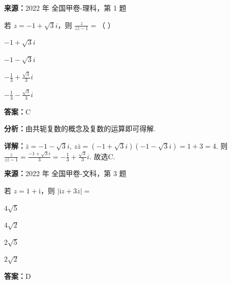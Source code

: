\begin{question}[points=5]
\textbf{来源：}2022 年 全国甲卷-理科，第 1 题\par
若 $z = -1 + \sqrt{3}i$，则 $\frac{z}{z\bar{z} - 1} = $（ ）
\begin{choices}
  \item $-1+\sqrt{3}i$
  \item $-1-\sqrt{3}i$
  \item $-\frac{1}{3}+\frac{\sqrt{3}}{3}i$
  \item $-\frac{1}{3}-\frac{\sqrt{3}}{3}i$
\end{choices}
\begin{solution}
\textbf{答案：}C

\textbf{分析：}由共轭复数的概念及复数的运算即可得解.

\textbf{详解：}$\bar{z} = -1 - \sqrt{3}i$, $z\bar{z} = (-1+\sqrt{3}i)(-1-\sqrt{3}i) = 1+3 = 4$. 则 $\frac{z}{z\bar{z}-1} = \frac{-1+\sqrt{3}i}{3} = -\frac{1}{3} + \frac{\sqrt{3}}{3}i$. 故选C.
\end{solution}
\end{question}

\begin{question}[points=5]
\textbf{来源：}2022 年 全国甲卷-文科，第 3 题\par
若 $z=1+\mathrm{i}$，则 $|\mathrm{i}z+3\overline{z}|=$
\begin{choices}
  \item $4\sqrt{5}$
  \item $4\sqrt{2}$
  \item $2\sqrt{5}$
  \item $2\sqrt{2}$
\end{choices}
\begin{solution}
\textbf{答案：}D
\end{solution}
\end{question}

